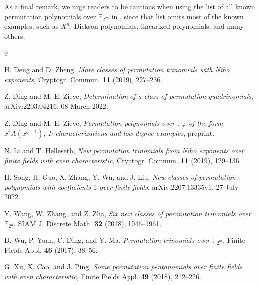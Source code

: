 \documentclass[11pt]{amsart}
\theoremstyle{definition}
\newcommand{\F}{\mathbb{F}}
\begin{document}
As a final remark, we urge readers to be cautious when using the list of all known permutation polynomials over $\F_{2^{2k}}$ in \cite[Thm.~7]{SGZWL}, since that list omits most of the known examples, such as $X^n$, Dickson polynomials, linearized polynomials, and many others.





%
\begin{thebibliography}{9}
\newcommand{\au}[1]{{#1},}
\newcommand{\ti}[1]{\textit{#1},}
\newcommand{\jo}[1]{{#1}}
\newcommand{\vo}[1]{\textbf{#1}}
\newcommand{\yr}[1]{(#1),}
\newcommand{\ppx}[1]{#1,}
\newcommand{\pp}[1]{#1.}
\newcommand{\pps}[1]{#1}
\newcommand{\bk}[1]{{#1},}
\newcommand{\inbk}[1]{in: \bk{#1}}
\newcommand{\xxx}[1]{{arXiv:#1}.}

\au{H. Deng and D. Zheng}
\ti{More classes of permutation trinomials with Niho exponents}
\jo{Cryptogr. Commun.}
\vo{11}
\yr{2019}
\pp{227--236}

\au{Z. Ding and M. E. Zieve}
\ti{Determination of a class of permutation quadrinomials}
arXiv:2203.04216, 08 March 2022.

\au{Z. Ding and M. E. Zieve}
\ti{Permutation polynomials over $\F_{q^2}$ of the form $x^r A(x^{q-1})$, I: characterizations and low-degree examples}
preprint.

\au{N. Li and T. Helleseth}
\ti{New permutation trinomials from Niho exponents over finite fields with even characteristic}
\jo{Cryptogr. Commun.}
\vo{11}
\yr{2019}
\pp{129--136}

\au{H. Song, H. Guo, X. Zhang, Y. Wu, and J. Liu}
\ti{New classes of permutation polynomials with coefficients $1$ over finite fields}
arXiv:2207.13335v1, 27 July 2022.

\au{Y. Wang, W. Zhang, and Z. Zha}
\ti{Six new classes of permutation trinomials over $\F_{2^n}$}
\jo{SIAM J. Discrete Math.}
\vo{32}
\yr{2018}
\pp{1946--1961}

\au{D. Wu, P. Yuan, C. Ding, and Y. Ma}
\ti{Permutation trinomials over $\F_{2^m}$}
\jo{Finite Fields Appl.}
\vo{46}
\yr{2017}
\pp{38--56}

\au{G. Xu, X. Cao, and J. Ping}
\ti{Some permutation pentanomials over finite fields with even characteristic}
\jo{Finite Fields Appl.}
\vo{49}
\yr{2018}
\pp{212--226}


\end{thebibliography}
\end{document}
